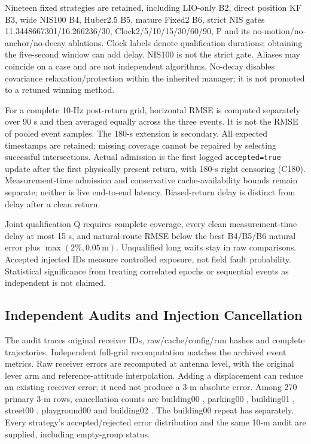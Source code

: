 \documentclass[conference]{IEEEtran}
\begin{document}
Nineteen fixed strategies are retained, including LIO-only B2, direct position KF B3, wide NIS100 B4, Huber2.5 B5, mature Fixed2 B6, strict NIS gates 11.3448667301/16.266236/30, Clock2/5/10/15/30/60/90, P and its no-motion/no-anchor/no-decay ablations. Clock labels denote qualification durations; obtaining the five-second window can add delay. NIS100 is not the strict gate. Aliases may coincide on a case and are not independent algorithms. No-decay disables covariance relaxation/protection within the inherited manager; it is not promoted to a retuned winning method.

For a complete 10-Hz post-return grid, horizontal RMSE is computed separately over 90 s and then averaged equally across the three events. It is not the RMSE of pooled event samples. The 180-s extension is secondary. All expected timestamps are retained; missing coverage cannot be repaired by selecting successful intersections. Actual admission is the first logged \texttt{accepted=true} update after the first physically present return, with 180-s right censoring (C180). Measurement-time admission and conservative cache-availability bounds remain separate; neither is live end-to-end latency. Biased-return delay is distinct from delay after a clean return.

Joint qualification Q requires complete coverage, every clean measurement-time delay at most 15 s, and natural-route RMSE below the best B4/B5/B6 natural error plus $\max(2\%,0.05\,\mathrm{m})$. Unqualified long waits stay in raw comparisons. Accepted injected IDs measure controlled exposure, not field fault probability. Statistical significance from treating correlated epochs or sequential events as independent is not claimed.

\subsection{Independent Audits and Injection Cancellation}
The audit traces original receiver IDs, raw/cache/config/run hashes and complete trajectories. Independent full-grid recomputation matches the archived event metrics. Raw receiver errors are recomputed at antenna level, with the original lever arm and reference-attitude interpolation. Adding a displacement can reduce an existing receiver error; it need not produce a 3-m absolute error. Among 270 primary 3-m rows, cancellation counts are building00 , parking00 , building01 , street00 , playground00  and building02 . The building00 repeat has  separately. Every strategy's accepted/rejected error distribution and the same 10-m audit are supplied, including empty-group status.
\end{document}
